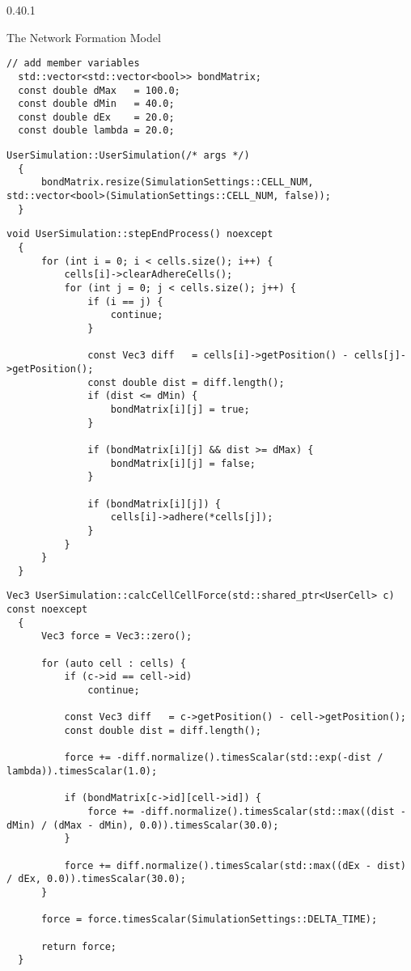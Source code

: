 \documentclass[vipdfmx,a4paper,11pt]{jsarticle}
\makeatletter
\renewcommand{\subsection}{%
  \@startsection{subsection}{1}{\z@}%
  {0.4\Cvs}{0.1\Cvs}%
  {\normalfont\large\headfont\raggedright}}
\makeatother
\begin{document}
\subsection{The Network Formation Model}
\begin{lstlisting}[caption=UserSimulation.hpp]
  // add member variables
  std::vector<std::vector<bool>> bondMatrix;
  const double dMax   = 100.0;
  const double dMin   = 40.0;
  const double dEx    = 20.0;
  const double lambda = 20.0;
\end{lstlisting}

\begin{lstlisting}[caption=UserSimulation()]
  UserSimulation::UserSimulation(/* args */)
  {
      bondMatrix.resize(SimulationSettings::CELL_NUM, std::vector<bool>(SimulationSettings::CELL_NUM, false));
  }
\end{lstlisting}

\begin{lstlisting}[caption=stepEndProcess()]
  void UserSimulation::stepEndProcess() noexcept
  {
      for (int i = 0; i < cells.size(); i++) {
          cells[i]->clearAdhereCells();
          for (int j = 0; j < cells.size(); j++) {
              if (i == j) {
                  continue;
              }

              const Vec3 diff   = cells[i]->getPosition() - cells[j]->getPosition();
              const double dist = diff.length();
              if (dist <= dMin) {
                  bondMatrix[i][j] = true;
              }

              if (bondMatrix[i][j] && dist >= dMax) {
                  bondMatrix[i][j] = false;
              }

              if (bondMatrix[i][j]) {
                  cells[i]->adhere(*cells[j]);
              }
          }
      }
  }
\end{lstlisting}

\begin{lstlisting}[caption=calcCellCellForce()]
  Vec3 UserSimulation::calcCellCellForce(std::shared_ptr<UserCell> c) const noexcept
  {
      Vec3 force = Vec3::zero();
  
      for (auto cell : cells) {
          if (c->id == cell->id)
              continue;
  
          const Vec3 diff   = c->getPosition() - cell->getPosition();
          const double dist = diff.length();
  
          force += -diff.normalize().timesScalar(std::exp(-dist / lambda)).timesScalar(1.0);
  
          if (bondMatrix[c->id][cell->id]) {
              force += -diff.normalize().timesScalar(std::max((dist - dMin) / (dMax - dMin), 0.0)).timesScalar(30.0);
          }
  
          force += diff.normalize().timesScalar(std::max((dEx - dist) / dEx, 0.0)).timesScalar(30.0);
      }
  
      force = force.timesScalar(SimulationSettings::DELTA_TIME);
  
      return force;
  }
\end{lstlisting}
\end{document}

